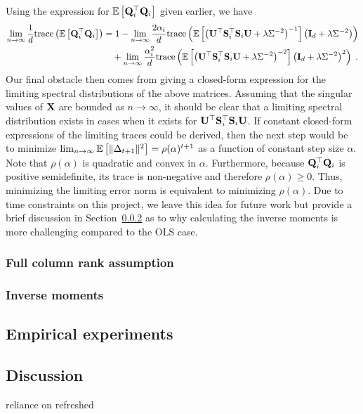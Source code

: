 Using the expression for $\mathbb{E}\left[\mathbf{Q}_i^\top\mathbf{Q}_i\right]$ given earlier, we have
\begin{align*}
\lim_{n\rightarrow\infty}\frac{1}{d}\mathrm{trace}\left(\mathbb{E}\left[\mathbf{Q}_i^\top\mathbf{Q}_i\right]\right) &= 1 - \lim_{n\rightarrow\infty}\frac{2\alpha_i}{d}\mathrm{trace}\left(\mathbb{E}\left[\left(\mathbf{U}^\top\mathbf{S}_i^\top\mathbf{S}_i\mathbf{U} + \lambda\Sigma^{-2}\right)^{-1}\right]\left(\mathbf{I}_d + \lambda\Sigma^{-2}\right)\right) \\
&\quad + \lim_{n\rightarrow\infty}\frac{\alpha_i^2}{d}\mathrm{trace}\left(\mathbb{E}\left[\left(\mathbf{U}^\top\mathbf{S}_i^\top\mathbf{S}_i\mathbf{U} + \lambda\Sigma^{-2}\right)^{-2}\right]\left(\mathbf{I}_d + \lambda\Sigma^{-2}\right)^2\right) \;.
\end{align*}
Our final obstacle then comes from giving a closed-form expression for the limiting spectral distributions of the above matrices. Assuming that the singular values of $\mathbf{X}$ are bounded as $n\rightarrow\infty$, it should be clear that a limiting spectral distribution exists in cases when it exists for $\mathbf{U}^\top\mathbf{S}_i^\top\mathbf{S}_i\mathbf{U}$. If constant closed-form expressions of the limiting traces could be derived, then the next step would be to minimize $\lim_{n\rightarrow\infty}\mathbb{E}\left[\|\Delta_{t+1}\|^2\right] = \rho(\alpha)^{t+1}$ as a function of constant step size $\alpha$. Note that $\rho(\alpha)$ is quadratic and convex in $\alpha$. Furthermore, because $\mathbf{Q}_i^\top\mathbf{Q}_i$ is positive semidefinite, its trace is non-negative and therefore $\rho(\alpha)\geq0$. Thus, minimizing the limiting error norm is equivalent to minimizing $\rho(\alpha)$. Due to time constraints on this project, we leave this idea for future work but provide a brief discussion in Section~\ref{sec:invmoment} as to why calculating the inverse moments is more challenging compared to the OLS case.

\subsubsection{Full column rank assumption} \label{sec:fullrank}

\subsubsection{Inverse moments} \label{sec:invmoment}


\subsection{Empirical experiments} \label{sec:empirical}


\subsection{Discussion} \label{sec:conclusion}

\todo reliance on refreshed